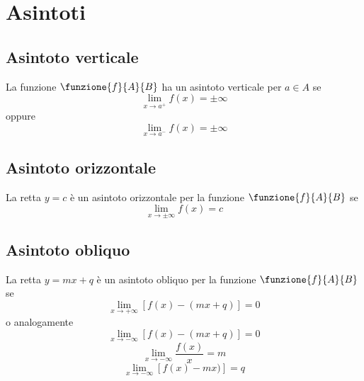 \chapter{Asintoti}
\section{Asintoto verticale}
La funzione $\funzione{f}{A}{B}$ ha un asintoto verticale per $a\in A$ se
\begin{equation*}
\lim_{x\to a^+} f(x)=\pm\infty
\end{equation*}
oppure
\begin{equation*}
\lim_{x\to a^-} f(x)=\pm\infty
\end{equation*}
\section{Asintoto orizzontale}
La retta $y=c$ è un asintoto orizzontale per la funzione  $\funzione{f}{A}{B}$  se \begin{equation*}
\lim_{x\to\pm\infty} f(x)=c
\end{equation*}
\section{Asintoto obliquo}
La retta $y=mx+q$ è un asintoto obliquo per la funzione  $\funzione{f}{A}{B}$ se
\begin{equation*}
\lim_{x\to +\infty} [f(x)-(mx+q)]=0
\end{equation*}
o analogamente
\begin{equation*}
\lim_{x\to -\infty} [f(x)-(mx+q)]=0
\end{equation*}
\begin{equation*}
\lim_{x\to -\infty} \dfrac{f(x)}{x}=m
\end{equation*}
\begin{equation*}
\lim_{x\to -\infty} [f(x)-mx)]=q
\end{equation*}